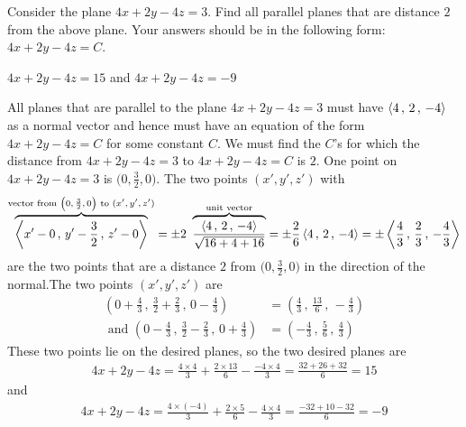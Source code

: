 \begin{question}[M200 2015D] %
Consider the plane $4x + 2y - 4z = 3$. Find all parallel planes that 
are distance $2$ from the above plane. Your answers should be in the 
following form: $4x + 2y - 4z = C$.
\end{question}

%

\begin{answer}
$4x + 2y - 4z=15$ and $4x + 2y - 4z=-9$ \qquad
\end{answer}

\begin{solution}
All planes that are parallel to the plane $4x + 2y - 4z = 3$
must have $\left< 4\,,\,2\,,\,-4\right>$ as a normal vector and
hence must have an equation of the form $4x + 2y - 4z = C$
for some constant $C$. We must find the $C$'s for which the distance
from  $4x + 2y - 4z = 3$ to $4x + 2y - 4z = C$ is $2$. 
One point on $4x + 2y - 4z = 3$ is $\big(0,\frac{3}{2},0\big)$.
The two points $(x',y',z')$ with
\begin{align*}
\overbrace{\left< x'-0\,,\,y'-\frac{3}{2}\,,\,z'-0\right>}^{\text{vector from 
$\big(0,\frac{3}{2},0\big)$ to $(x',y',z')$}}
=\pm 2\ \overbrace{\frac{\left< 4\,,\,2\,,\,-4\right>}{\sqrt{16+4+16}}}^{\text{unit vector}}
=\pm \frac{2}{6} \left< 4\,,\,2\,,\,-4\right>
=\pm\left< \frac{4}{3}\,,\,\frac{2}{3}\,,\,-\frac{4}{3}\right>
\end{align*}
are the two points that are a distance $2$ from $\big(0,\frac{3}{2},0\big)$
in the direction of the normal.The two points $(x',y',z')$ are
\begin{align*}
\left(0+\frac{4}{3}\,,\, \frac{3}{2}+\frac{2}{3}\,,\,0-\frac{4}{3}\right)
&=\left(\frac{4}{3}\,,\, \frac{13}{6}\,,\,-\frac{4}{3}\right) \\\text{ and }
\left(0-\frac{4}{3}\,,\, \frac{3}{2}-\frac{2}{3}\,,\,0+\frac{4}{3}\right)
&=\left(-\frac{4}{3}\,,\, \frac{5}{6}\,,\,\frac{4}{3}\right)
\end{align*}
These two points lie on the desired planes, so the two desired planes are
\begin{align*}
4x + 2y - 4z
=\frac{4\times 4}{3} +\frac{2\times 13}{6}-\frac{-4\times 4}{3}
=\frac{32+26+32}{6}
=15
\end{align*}
and 
\begin{align*}
4x + 2y - 4z
=\frac{4\times(-4)}{3} +\frac{2\times 5}{6}-\frac{4\times 4}{3}
=\frac{-32+10-32}{6}
=-9
\end{align*}
\end{solution}

